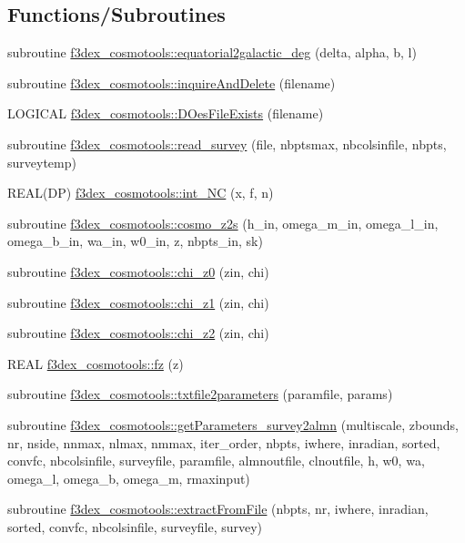 \subsection*{Functions/Subroutines}
\begin{DoxyCompactItemize}
\item 
subroutine \hyperlink{namespacef3dex__cosmotools_abeb005e8bef92ebc0927b69db637906d}{f3dex\_\-cosmotools::equatorial2galactic\_\-deg} (delta, alpha, b, l)
\item 
subroutine \hyperlink{namespacef3dex__cosmotools_a0caf479bc891741c90e36f878444e333}{f3dex\_\-cosmotools::inquireAndDelete} (filename)
\item 
LOGICAL \hyperlink{namespacef3dex__cosmotools_ae0ff007b365be41cbcf5e7ed24cccac2}{f3dex\_\-cosmotools::DOesFileExists} (filename)
\item 
subroutine \hyperlink{namespacef3dex__cosmotools_a36578d36cffe32d26a9fd914d032ef3a}{f3dex\_\-cosmotools::read\_\-survey} (file, nbptsmax, nbcolsinfile, nbpts, surveytemp)
\item 
REAL(DP) \hyperlink{namespacef3dex__cosmotools_a25e2703c39b2d99c864537823f2f8402}{f3dex\_\-cosmotools::int\_\-NC} (x, f, n)
\item 
subroutine \hyperlink{namespacef3dex__cosmotools_a78ae43d2bd5f180e65c710dc694bcee4}{f3dex\_\-cosmotools::cosmo\_\-z2s} (h\_\-in, omega\_\-m\_\-in, omega\_\-l\_\-in, omega\_\-b\_\-in, wa\_\-in, w0\_\-in, z, nbpts\_\-in, sk)
\item 
subroutine \hyperlink{namespacef3dex__cosmotools_abdbb37c7c522bf29ebf089412b9d7854}{f3dex\_\-cosmotools::chi\_\-z0} (zin, chi)
\item 
subroutine \hyperlink{namespacef3dex__cosmotools_aae4fa92003adf2bfde48fa0dfcbf6b51}{f3dex\_\-cosmotools::chi\_\-z1} (zin, chi)
\item 
subroutine \hyperlink{namespacef3dex__cosmotools_a6c29a874ae95da9fb207a2f63729eecf}{f3dex\_\-cosmotools::chi\_\-z2} (zin, chi)
\item 
REAL \hyperlink{namespacef3dex__cosmotools_abba0e9b02d0f46a5abce5a0830da7f4d}{f3dex\_\-cosmotools::fz} (z)
\item 
subroutine \hyperlink{namespacef3dex__cosmotools_a609d3f29da9fc1be3bf27757e25532eb}{f3dex\_\-cosmotools::txtfile2parameters} (paramfile, params)
\item 
subroutine \hyperlink{namespacef3dex__cosmotools_a8405dbd12e86a408520f40f1b0a68919}{f3dex\_\-cosmotools::getParameters\_\-survey2almn} (multiscale, zbounds, nr, nside, nnmax, nlmax, nmmax, iter\_\-order, nbpts, iwhere, inradian, sorted, convfc, nbcolsinfile, surveyfile, paramfile, almnoutfile, clnoutfile, h, w0, wa, omega\_\-l, omega\_\-b, omega\_\-m, rmaxinput)
\item 
subroutine \hyperlink{namespacef3dex__cosmotools_aaef3c07f112a83e6ff7a2762d5202fae}{f3dex\_\-cosmotools::extractFromFile} (nbpts, nr, iwhere, inradian, sorted, convfc, nbcolsinfile, surveyfile, survey)
\end{DoxyCompactItemize}
